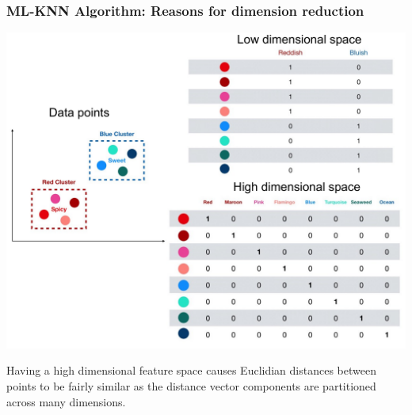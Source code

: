 \documentclass{beamer}
\begin{document}
\begin{frame}[t]
\frametitle{ML-KNN Algorithm: Reasons for dimension reduction}
\begin{center}
\includegraphics[width=0.7\textheight]{Images/DimRed.pdf}
\end{center}
Having a high dimensional feature space causes Euclidian distances between points to be fairly similar as the distance vector components are partitioned across many dimensions. 


\end{frame}
\end{document}
